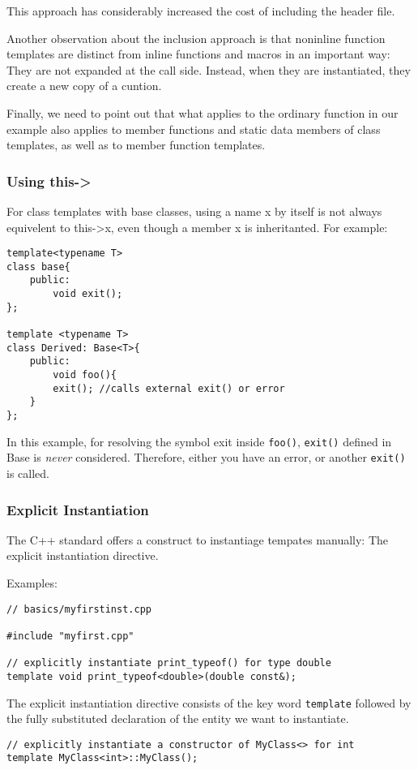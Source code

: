 \documentclass[11pt, a4paper]{book}
\begin{document}
\begin{itemize}
This approach has considerably increased the cost of including the header file.

Another observation about the inclusion approach is that noninline function templates are distinct from inline functions and macros in an important way: They are not expanded at the call side. Instead, when they are instantiated, they create a new copy of a cuntion.

Finally, we need to point out that what applies to the ordinary function in our example also applies to member functions and static data members of class templates, as well as to member function templates.
\subsubsection{Using this->}
For class templates with base classes, using a name x by itself is not always equivelent to this->x, even though a member x is inheritanted. For example:
\begin{verbatim}
template<typename T>
class base{
    public:
        void exit();
};

template <typename T>
class Derived: Base<T>{
    public:
        void foo(){
	    exit(); //calls external exit() or error
	}
};
\end{verbatim}

In this example, for resolving the symbol exit inside \verb|foo()|, \verb|exit()| defined in Base is \emph{never} considered. Therefore, either you have an error, or another \verb|exit()| is called.

\subsubsection{Explicit Instantiation}
The C++ standard offers a construct to instantiage tempates manually: The explicit instantiation directive.

Examples:
\begin{verbatim}
// basics/myfirstinst.cpp 

#include "myfirst.cpp" 

// explicitly instantiate print_typeof() for type double 
template void print_typeof<double>(double const&); 
\end{verbatim}
The explicit instantiation directive consists of the key word \verb|template| followed by the fully substituted declaration of the entity we want to instantiate.
\begin{verbatim}
// explicitly instantiate a constructor of MyClass<> for int 
template MyClass<int>::MyClass(); 


\end{verbatim}
\end{itemize}
\end{document}
